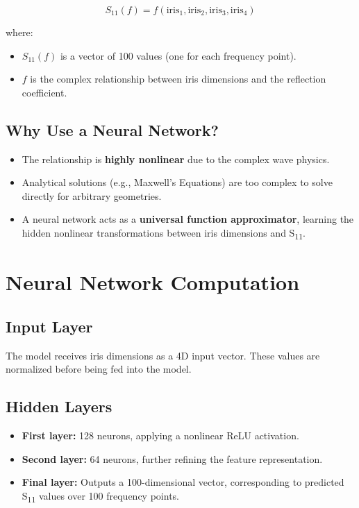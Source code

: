 \documentclass{article}
\begin{document}
\[
S_{11}(f) = f(\text{iris}_1, \text{iris}_2, \text{iris}_3, \text{iris}_4)
\]

where:
\begin{itemize}
    \item \( S_{11}(f) \) is a vector of 100 values (one for each frequency point).
    \item \( f \) is the complex relationship between iris dimensions and the reflection coefficient.
\end{itemize}

\subsection{Why Use a Neural Network?}
\begin{itemize}
    \item The relationship is \textbf{highly nonlinear} due to the complex wave physics.
    \item Analytical solutions (e.g., Maxwell’s Equations) are too complex to solve directly for arbitrary geometries.
    \item A neural network acts as a \textbf{universal function approximator}, learning the hidden nonlinear transformations between iris dimensions and S\textsubscript{11}.
\end{itemize}

\section{Neural Network Computation}
\subsection{Input Layer}
The model receives iris dimensions as a 4D input vector. These values are normalized before being fed into the model.

\subsection{Hidden Layers}
\begin{itemize}
    \item \textbf{First layer:} 128 neurons, applying a nonlinear ReLU activation.
    \item \textbf{Second layer:} 64 neurons, further refining the feature representation.
    \item \textbf{Final layer:} Outputs a 100-dimensional vector, corresponding to predicted S\textsubscript{11} values over 100 frequency points.
\end{itemize}
\end{document}
